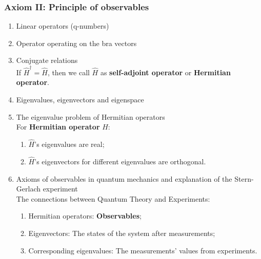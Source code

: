 \documentclass[12pt]{article}
\numberwithin{equation}{section}
\begin{document}
\subsubsection{Axiom II: Principle of observables}
\begin{enumerate}
\item Linear operators (q-numbers)
\item Operator operating on the bra vectors
\item Conjugate relations \\
	If $\hat{H}^\dag=\hat{H}$, then we call $\hat{H}$ as \textbf{self-adjoint operator} or \textbf{Hermitian operator}.
\item Eigenvalues, eigenvectors and eigenspace
\item The eigenvalue problem of Hermitian operators \\
	For \textbf{Hermitian operator} $\hat{H}$:
	\begin{enumerate}
	\item $\hat{H}$'s eigenvalues are real;
	\item $\hat{H}$'s eigenvectors for different eigenvalues are orthogonal.
	\end{enumerate}
\item Axioms of observables in quantum mechanics and explanation of the Stern-Gerlach experiment \\
	The connections between Quantum Theory and Experiments:
	\begin{enumerate}
	\item Hermitian operators: \textbf{Observables};  
	\item Eigenvectors: The states of the system after measurements;
	\item Corresponding eigenvalues: The measurements' values from experiments.
	\end{enumerate}
\end{enumerate}
\end{document}
